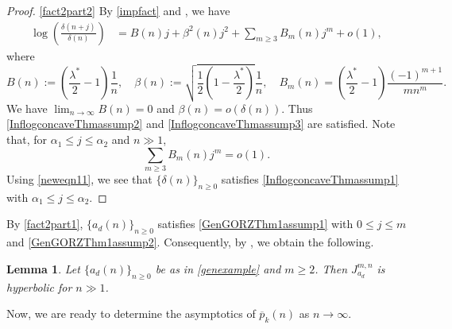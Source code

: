 \documentclass[11pt,reqno,a4paper]{amsart}
\renewcommand{\a}{\alpha}
\renewcommand{\b}{\beta}
\renewcommand{\d}{{\delta}}
\renewcommand{\l}{\lambda}
\renewcommand{\(}{\left\(}
\renewcommand{\)}{\right\)}
\numberwithin{equation}{section}
\theoremstyle{plain}
\newtheorem{lemma}[theorem]{Lemma}
\theoremstyle{definition} %
\numberwithin{equation}{section}
\begin{document}
\begin{proof}
\noindent \ref{fact2part2}  By \eqref{impfact} and , we have %
\begin{align}\label{neweqn11}
\log\left(\frac{\d(n+j)}{\d(n)}\right)
&=B(n)j+\beta^2(n)j^2+\sum_{m\ge 3}B_{m}(n)j^m+o(1),
\end{align}
where
\[
B(n):=\left(\frac{\l^*}{2}-1\right)\frac 1n,\quad \beta(n):=\sqrt{\frac 12\left(1-\frac{\l^*}{2}\right)}\frac 1n,\quad B_m(n)=\left(\frac{\l^*}{2}-1\right)\frac{(-1)^{m+1}}{m n^m}.
\]
We have $\lim_{n\to \infty}B(n)=0$ and $\b(n)=o(\d(n))$. Thus \ref{InflogconcaveThmassump2} and \ref{InflogconcaveThmassump3} are satisfied. Note that, for $\a_1\le j\le \a_2$ and $n\!\gg\!1$, %
\[
\sum_{m\ge 3}B_{m}(n)j^m=o(1).
\] 
Using \eqref{neweqn11}, we see that $\{\d(n)\}_{n\ge 0}$ satisfies \ref{InflogconcaveThmassump1} with $\a_1\le j\le \a_2$.\qedhere 
\end{proof}



 By  \ref{fact2part1}, $\{a_d(n)\}_{n\ge 0}$ satisfies \ref{GenGORZThm1assump1} with $0\le j\le m$ and \ref{GenGORZThm1assump2}. Consequently, by , we obtain the following.

\begin{lemma}\label{sec:Jensenlem1}
	Let $\{a_d(n)\}_{n\ge 0}$ be as in \eqref{genexample} and $m\ge 2$. Then $J^{m,n}_{a_d}$ is hyperbolic for $n\gg 1$.
\end{lemma}




 Now, we are ready to determine the asymptotics of  $\overline{p}_k(n)$ as $n\to \infty$.
\end{document}
